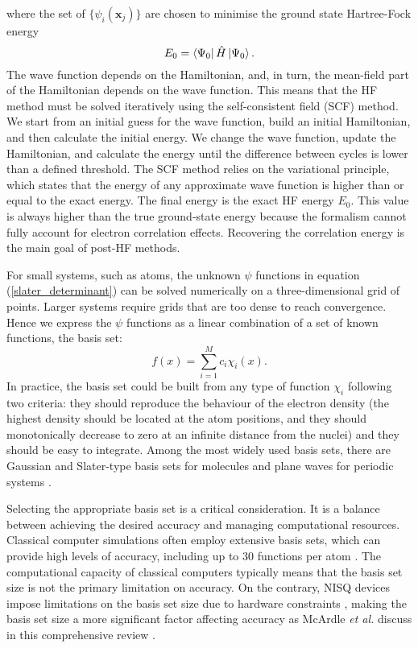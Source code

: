 \documentclass[10pt]{iopart}
\begin{document}
where the set of $\{\psi_i(\mathbf{x}_j)\}$ are chosen to minimise the ground state Hartree-Fock energy 
\begin{equation}
E_0 = \bra{\Psi_0} \hat{H} \ket{\Psi_0}.
\end{equation}
The wave function depends on the Hamiltonian, and, in turn, the mean-field part of the Hamiltonian depends on the wave function. This means that the HF method must be solved iteratively using the self-consistent field (SCF) method. We start from an initial guess for the wave function, build an initial Hamiltonian, and then calculate the initial energy. We change the wave function, update the Hamiltonian, and calculate the energy until the difference between cycles is lower than a defined threshold. The SCF method relies on the variational principle, which states that the energy of any approximate wave function is higher than or equal to the exact energy. 
The final energy is the exact HF energy $E_0$. This value is always higher than the true ground-state energy because the formalism cannot fully account for electron correlation effects. Recovering the correlation energy is the main goal of post-HF methods.

For small systems, such as atoms, the unknown $\psi$ functions in equation (\ref{slater_determinant}) can be solved numerically on a three-dimensional grid of points. Larger systems require grids that are too dense to reach convergence. Hence we express the $\psi$ functions as a linear combination of a set of known functions, the basis set:
\begin{equation}
f(x) = \sum_{i=1}^{M}c_{i}\chi_{i}(x).
\end{equation}
In practice, the basis set could be built from any type of function $\chi_{i}$ following two criteria: they should reproduce the behaviour of the electron density (the highest density should be located at the atom positions, and they should monotonically decrease to zero at an infinite distance from the nuclei) and they should be easy to integrate. Among the most widely used basis sets, there are Gaussian and Slater-type basis sets for molecules \cite{basisset} and plane waves for periodic systems \cite{Singh2006}. 

Selecting the appropriate basis set is a critical consideration. It is a balance between achieving the desired accuracy and managing computational resources. Classical computer simulations often employ extensive basis sets, which can provide high levels of accuracy, including up to 30 functions per atom \cite{Peterson2007,Jensen2016}. The computational capacity of classical computers typically means that the basis set size is not the primary limitation on accuracy. On the contrary, NISQ devices impose limitations on the basis set size due to hardware constraints \cite{Chien2022}, making the basis set size a more significant factor affecting accuracy as McArdle \textit{et al.} discuss in this comprehensive review \cite{McArdle2020}.
\end{document}
